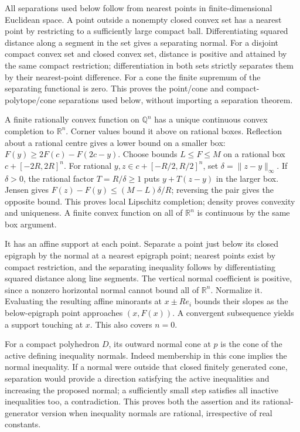 \documentclass[
  11pt,
]{article}
\begin{document}
All separations used below follow from nearest points in
finite-dimensional Euclidean space. A point outside a nonempty closed
convex set has a nearest point by restricting to a sufficiently large
compact ball. Differentiating squared distance along a segment in the
set gives a separating normal. For a disjoint compact convex set and
closed convex set, distance is positive and attained by the same compact
restriction; differentiation in both sets strictly separates them by
their nearest-point difference. For a cone the finite supremum of the
separating functional is zero. This proves the point/cone and
compact-polytope/cone separations used below, without importing a
separation theorem.

A finite rationally convex function on \(\mathbb{Q}^n\) has a unique
continuous convex completion to \(\mathbb{R}^n\). Corner values bound it
above on rational boxes. Reflection about a rational centre gives a
lower bound on a smaller box: \(F(y)\geq2F(c)-F(2c-y)\). Choose bounds
\(L\leq F\leq M\) on a rational box \(c+[-2R,2R]^n\). For rational
\(y,z\in c+[-R/2,R/2]^n\), set \(\delta=\|z-y\|_\infty\). If
\(\delta>0\), the rational factor \(T=R/\delta\geq1\) puts \(y+T(z-y)\)
in the larger box. Jensen gives \(F(z)-F(y)\leq(M-L)\delta/R\);
reversing the pair gives the opposite bound. This proves local Lipschitz
completion; density proves convexity and uniqueness. A finite convex
function on all of \(\mathbb{R}^n\) is continuous by the same box
argument.

It has an affine support at each point. Separate a point just below its
closed epigraph by the normal at a nearest epigraph point; nearest
points exist by compact restriction, and the separating inequality
follows by differentiating squared distance along line segments. The
vertical normal coefficient is positive, since a nonzero horizontal
normal cannot bound all of \(\mathbb{R}^n\). Normalize it. Evaluating
the resulting affine minorants at \(x\pm Re_i\) bounds their slopes as
the below-epigraph point approaches \((x,F(x))\). A convergent
subsequence yields a support touching at \(x\). This also covers
\(n=0\).

For a compact polyhedron \(D\), its outward normal cone at \(p\) is the
cone of the active defining inequality normals. Indeed membership in
this cone implies the normal inequality. If a normal were outside that
closed finitely generated cone, separation would provide a direction
satisfying the active inequalities and increasing the proposed normal; a
sufficiently small step satisfies all inactive inequalities too, a
contradiction. This proves both the assertion and its rational-generator
version when inequality normals are rational, irrespective of real
constants.
\end{document}
